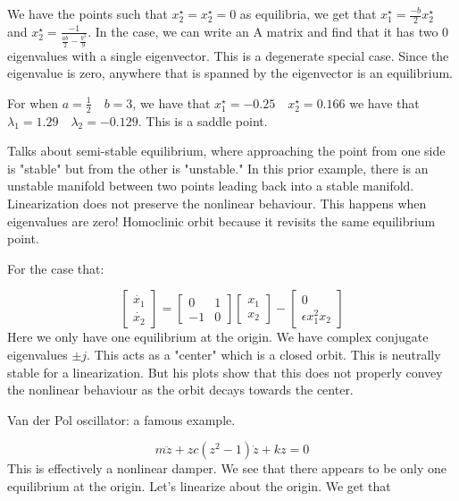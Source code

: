 \documentclass[11pt]{article}
\begin{document}
We have the points such that $x_2^\star = x_2^\star = 0$ as equilibria, we get that $x_1^\star = \frac{-b}{2}x_2^\star$ and $x_2 ^\star = \frac{-1}{\frac{ab}{2} -\frac{b^3}{9}}$. In the case, we can write an A matrix and find that it has two 0 eigenvalues with a single eigenvector. This is a degenerate special case. Since the eigenvalue is zero, anywhere that is spanned by the eigenvector is an equilibrium. 

For when $a = \frac{1}{2}\quad b=3$, we have that $x_1^\star = -0.25 \quad x_2^\star = 0.166$ we have that $\lambda _1 = 1.29 \quad \lambda_2 = -0.129$. This is a saddle point.

Talks about semi-stable equilibrium, where approaching the point from one side is "stable" but from the other is "unstable." In this prior example, there is an unstable manifold between two points leading back into a stable manifold. Linearization does not preserve the nonlinear behaviour. This happens when eigenvalues are zero! Homoclinic orbit because it revisits the same equilibrium point.

For the case that:

\begin{equation}
\begin{bmatrix}
\dot{x_1} \\
\dot{x_2}
\end{bmatrix}
=
\begin{bmatrix}
0 & 1 \\
-1 & 0
\end{bmatrix}
\begin{bmatrix}
{x_1} \\
{x_2}
\end{bmatrix}
-
\begin{bmatrix}
0 \\
\epsilon x_1^2 x_2
\end{bmatrix}
\end{equation}
Here we only have one equilibrium at the origin. We have complex conjugate eigenvalues $\pm j$. This acts as a "center" which is a closed orbit. This is neutrally stable for a linearization. But his plots show that this does not properly convey the nonlinear behaviour as the orbit decays towards the center.

Van der Pol oscillator: a famous example.

\begin{equation}
m\ddot{z} + zc(z^2-1)\dot{z} + kz =0	
\end{equation}
This is effectively a nonlinear damper. We see that there appears to be only one equilibrium at the origin. Let's linearize about the origin. We get that 
\end{document}
